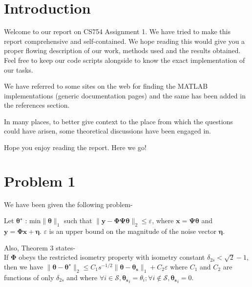 \documentclass[a4paper,11pt]{article}
\numberwithin{definition}{section}
\numberwithin{mytheorem}{subsection}
\begin{document}

\date{Spring 2022}
\maketitle

\justifying
\tableofcontents

\newpage
\justifying
\section*{Introduction}

Welcome  to our report on CS754 Assignment 1. We have tried to make this report comprehensive and self-contained. We hope reading this would give you a proper flowing description of our work, methods used and the results obtained. Feel free to keep our code scripts alongside to know the exact implementation of our tasks. 

We have referred to some sites on the web for finding the MATLAB implementations (generic documentation pages) and the same has been added in the references section. 

In many places, to better give context to the place from which the questions could have arisen, some theoretical discussions have been engaged in.

Hope you enjoy reading the report. Here we go!




\newpage
\section{Problem 1}
We have been given the following problem-

Let $\boldsymbol{\theta^{\star}}$ : $\textrm{min} \|\boldsymbol{\theta}\|_1$ such that $\|\boldsymbol{y}-\boldsymbol{\Phi \Psi \theta}\|_2 \leq \varepsilon$, where $\boldsymbol{x} = \boldsymbol{\Psi \theta}$ and $\boldsymbol{y} = \boldsymbol{\Phi x} + \boldsymbol{\eta}$. $\varepsilon$ is an upper bound on the magnitude of the noise vector $\boldsymbol{\eta}$.

Also, Theorem 3 states-\\If $\boldsymbol{\Phi}$ obeys the restricted isometry property with isometry constant $\delta_{2s} < \sqrt{2}-1$, then we have $\|\boldsymbol{\theta} - \boldsymbol{\theta^{\star}}\|_2 \leq C_1 s^{-1/2}\|\boldsymbol{\theta}-\boldsymbol{\theta_s}\|_1 + C_2 \varepsilon$ where $C_1$ and $C_2$ are functions of only $\delta_{2s}$ and where $\forall i \in \mathcal{S}, \boldsymbol{\theta_s}_i = \theta_i; \forall i \notin \mathcal{S}, \boldsymbol{\theta_s}_i = 0$.
\end{document}
